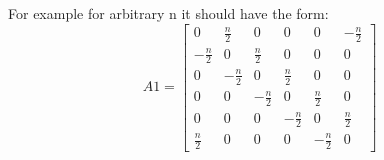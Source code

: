 \documentclass[12pt, titlepage]{article}
\begin{document}
For example for arbitrary n it should have the form: 
\[
A1=
\begin{bmatrix}
0 & \frac{n}{2} & 0 & 0 & 0 &-\frac{n}{2}\\
-\frac{n}{2} & 0 & \frac{n}{2} & 0 & 0 &0\\
0 & -\frac{n}{2} & 0 & \frac{n}{2} & 0 &0\\
0 & 0 & -\frac{n}{2} & 0 & \frac{n}{2} &0\\
0 & 0 & 0 & -\frac{n}{2} & 0 &\frac{n}{2} \\ 
\frac{n}{2} & 0 & 0 & 0 & -\frac{n}{2} & 0 
\end{bmatrix}
\] 
\end{document}
